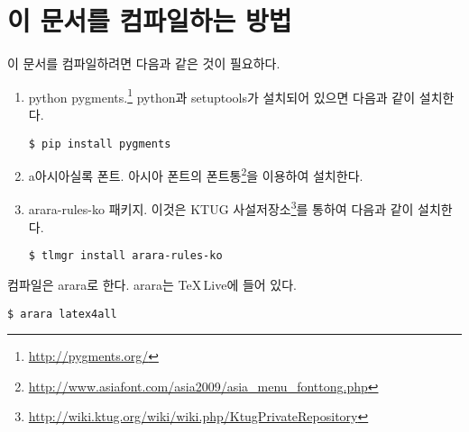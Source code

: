 %
\renewcommand\appendixname{부록}
\AttachAppendixTitleToSecnum
\AppendixTitleToToc
\appendix
\section{이 문서를 컴파일하는 방법}

이 문서를 컴파일하려면 다음과 같은 것이 필요하다.
\begin{enumerate}[(1)]
\item python pygments.\footnote{\url{http://pygments.org/}}
python과 setuptools가 설치되어 있으면 다음과 같이 설치한다.
\begin{verbatim}
$ pip install pygments
\end{verbatim}
\item a아시아실록 폰트. 아시아 폰트의 폰트통\footnote{\url{http://www.asiafont.com/asia2009/asia_menu_fonttong.php}}을 이용하여 설치한다.
\item arara-rules-ko 패키지. 이것은 KTUG 사설저장소\footnote{\url{http://wiki.ktug.org/wiki/wiki.php/KtugPrivateRepository}}를 통하여 다음과 같이 설치한다.
\begin{verbatim}
$ tlmgr install arara-rules-ko
\end{verbatim}
\end{enumerate}

컴파일은 arara로 한다. arara는 \TeX\,Live에 들어 있다.
\begin{verbatim}
$ arara latex4all
\end{verbatim}
\clearpage
